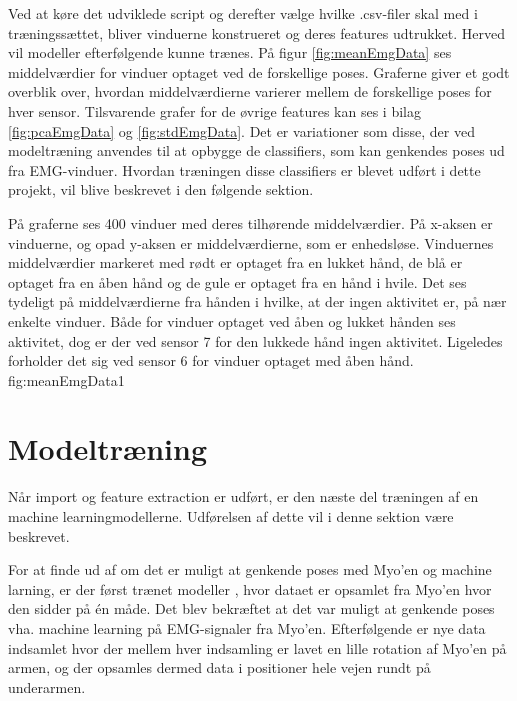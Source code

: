  Ved at køre det udviklede script og derefter vælge hvilke .csv-filer skal med i træningssættet, bliver vinduerne konstrueret og deres features udtrukket. Herved vil modeller efterfølgende kunne trænes. På figur \ref{fig:meanEmgData} ses middelværdier for vinduer optaget ved de forskellige poses. Graferne giver et godt overblik over, hvordan middelværdierne varierer mellem de forskellige poses for hver sensor. Tilsvarende grafer for de øvrige features kan ses i bilag \ref{fig:pcaEmgData} og \ref{fig:stdEmgData}. Det er variationer som disse, der ved modeltræning anvendes til at opbygge de classifiers, som kan genkendes poses ud fra EMG-vinduer. Hvordan træningen disse classifiers er blevet udført i dette projekt, vil blive beskrevet i den følgende sektion.
 
{
	På graferne ses 400 vinduer med deres tilhørende middelværdier. På x-aksen er vinduerne, og opad y-aksen er middelværdierne, som er enhedsløse. Vinduernes middelværdier markeret med rødt er optaget fra en lukket hånd, de blå er optaget fra en åben hånd og de gule er optaget fra en hånd i hvile. Det ses tydeligt på middelværdierne fra hånden i hvilke, at der ingen aktivitet er, på nær enkelte vinduer. Både for vinduer optaget ved åben og lukket hånden ses aktivitet, dog er der ved sensor 7 for den lukkede hånd ingen aktivitet. Ligeledes forholder det sig ved sensor 6 for vinduer optaget med åben hånd.
 }{fig:meanEmgData}{1}

\section{Modeltræning}
Når import og feature extraction er udført, er den næste del træningen af en machine learningmodellerne. Udførelsen af dette vil i denne sektion være beskrevet.


For at finde ud af om det er muligt at genkende poses med Myo'en og machine larning, er der først trænet modeller , hvor dataet er opsamlet fra Myo'en hvor den sidder på én måde. Det blev bekræftet at det var muligt at genkende poses vha. machine learning på EMG-signaler fra Myo'en. Efterfølgende er nye data indsamlet hvor der mellem hver indsamling er lavet en lille rotation af Myo'en på armen, og der opsamles dermed data i positioner hele vejen rundt på underarmen.

